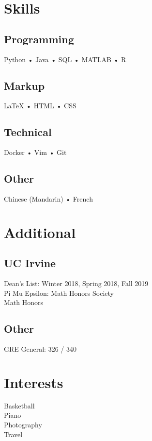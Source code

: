 \documentclass[]{deedy-resume-openfont}
\begin{document}
\begin{minipage}[t]{0.33\textwidth}

\section{Skills}
\subsection{Programming}
Python • Java • SQL • MATLAB • R
\subsection{Markup}
{\LaTeX} • HTML • CSS
\subsection{Technical}
Docker • Vim • Git
\subsection{Other}
Chinese (Mandarin) • French
\sectionsep


\section{Additional}
\subsection{UC Irvine}
Dean's List: Winter 2018, Spring 2018, Fall 2019 \\
Pi Mu Epsilon: Math Honors Society \\
Math Honors
\subsection{Other}
GRE General: 326 / 340 
\sectionsep

\section{Interests}
Basketball \\ Piano \\ Photography \\ Travel
\sectionsep

%
%

\end{minipage} 
\hfill
\end{document}
